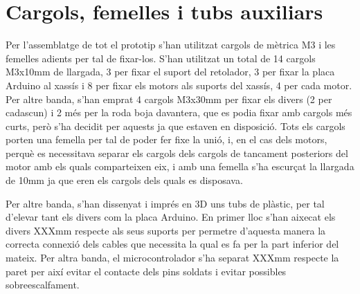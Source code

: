 \section{Cargols, femelles i tubs auxiliars}

Per l’assemblatge de tot el prototip s’han utilitzat cargols de mètrica M3 i les femelles adients per tal de fixar-los. S’han utilitzat un total de 14 cargols M3x10mm de llargada, 3 per fixar el suport del retolador, 3 per fixar la placa Arduino al xassís i 8 per fixar els motors als suports del xassís, 4 per cada motor. Per altre banda, s’han emprat 4 cargols M3x30mm per fixar els divers (2 per cadascun) i 2 més per la roda boja davantera, que es podia fixar amb cargols més curts, però s’ha decidit per aquests ja que estaven en disposició. Tots els cargols porten una femella per tal de poder fer fixe la unió, i, en el cas dels motors, perquè es necessitava separar els cargols dels cargols de tancament posteriors del motor amb els quals comparteixen eix, i amb una femella s’ha escurçat la llargada de 10mm ja que eren els cargols dels quals es disposava. 

Per altre banda, s'han dissenyat i imprés en 3D uns tubs de plàstic, per tal d’elevar tant els divers com la placa Arduino. En primer lloc s’han aixecat els divers XXXmm respecte als seus suports per permetre d’aquesta manera la correcta connexió dels cables que necessita la qual es fa per la part inferior del mateix. Per altra banda, el microcontrolador s’ha separat XXXmm respecte la paret per així evitar el contacte dels pins soldats i evitar possibles sobreescalfament. 

